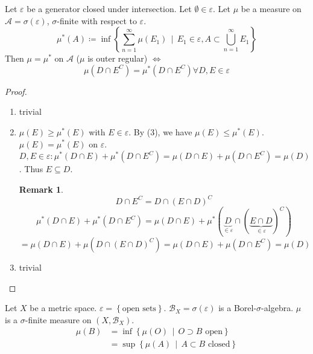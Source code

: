 \documentclass[a4paper]{article}
\numberwithin{lecref}{section}
\theoremstyle{break}
\newtheorem*{Remark}{Remark}
\newcommand{\Set}[1]{\left\{#1\right\}}
\newcommand{\SetDef}[2]{\left\{#1\,\mid\,#2\right\}}
\begin{document}
\begin{theorem}
  Let $\varepsilon$ be a generator closed under intersection. Let $\emptyset \in \varepsilon$.
  Let $\mu$ be a measure on $\mathcal A = \sigma(\varepsilon)$, $\sigma$-finite with respect to $\varepsilon$.
  \[ \mu^*(A) \coloneqq \inf\SetDef{\sum_{n=1}^\infty \mu(E_1)}{E_1 \in \varepsilon, A \subset \bigcup_{n=1}^\infty E_1} \]
  Then $\mu = \mu^*$ on $\mathcal A$ ($\mu$ is outer regular) $\iff$
  \[ \mu(D \cap E^C) = \mu^*(D \cap E^C) \forall D, E \in \varepsilon \]
\end{theorem}

\begin{proof}
  \begin{enumerate}
    \item trivial
    \item
      $\mu(E) \geq \mu^*(E)$ with $E \in \varepsilon$.
      By (3), we have $\mu(E) \leq \mu^*(E)$.
      $\mu(E) = \mu^*(E)$ on $\varepsilon$.
      $D, E \in \varepsilon: \mu^*(D \cap E) + \mu^*(D \cap E^C) = \mu(D \cap E) + \mu(D \cap E^C) = \mu(D)$.
      Thus $E \subseteq D$.

      \begin{Remark}
        \[ D \cap E^C = D \cap (E \cap D)^C \]
        \[ \mu^*(D \cap E) + \mu^*(D \cap E^C) = \mu(D \cap E) + \mu^*(\underbrace{D}_{\in \varepsilon} \cap (\underbrace{E \cap D}_{\in \varepsilon})^C) \]
        \[ = \mu(D \cap E) + \mu(D \cap (E \cap D)^C) = \mu(D \cap E) + \mu(D \cap E^C) = \mu(D) \]
      \end{Remark}
    \item trivial
  \end{enumerate}
\end{proof}

\begin{theorem}
  Let $X$ be a metric space. $\varepsilon = \Set{\text{open sets}}$.
  $\mathcal B_{X} = \sigma(\varepsilon)$ is a Borel-$\sigma$-algebra.
  $\mu$ is a $\sigma$-finite measure on $(X, \mathcal B_{X})$.
  \begin{align*}
    \mu(B) &= \inf\SetDef{\mu(O)}{O \supset B \text{ open}} \\
           &= \sup\SetDef{\mu(A)}{A \subset B \text{ closed}}
  \end{align*}
\end{theorem}
\end{document}
